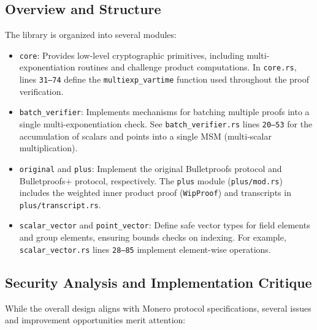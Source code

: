\documentclass[12pt,a4paper]{article}
\begin{document}

\subsection{Overview and Structure}
The library is organized into several modules:
\begin{itemize}
    \item \texttt{core}:
    Provides low-level cryptographic primitives, including multi-exponentiation routines and challenge product computations. In \texttt{core.rs}, lines \texttt{31--74} define the \texttt{multiexp\_vartime} function used throughout the proof verification.
    \item \texttt{batch\_verifier}:
    Implements mechanisms for batching multiple proofs into a single multi-exponentiation check. See \texttt{batch\_verifier.rs} lines \texttt{20--53} for the accumulation of scalars and points into a single MSM (multi-scalar multiplication).
    \item \texttt{original} and \texttt{plus}:
    Implement the original Bulletproofs protocol and Bulletproofs+ protocol, respectively. The \texttt{plus} module (\texttt{plus/mod.rs}) includes the weighted inner product proof (\texttt{WipProof}) and transcripts in \texttt{plus/transcript.rs}.
    \item \texttt{scalar\_vector} and \texttt{point\_vector}:
    Define safe vector types for field elements and group elements, ensuring bounds checks on indexing. For example, \texttt{scalar\_vector.rs} lines \texttt{28--85} implement element-wise operations.
\end{itemize}

\subsection{Security Analysis and Implementation Critique}
While the overall design aligns with Monero protocol specifications, several issues and improvement opportunities merit attention:
\end{document}
